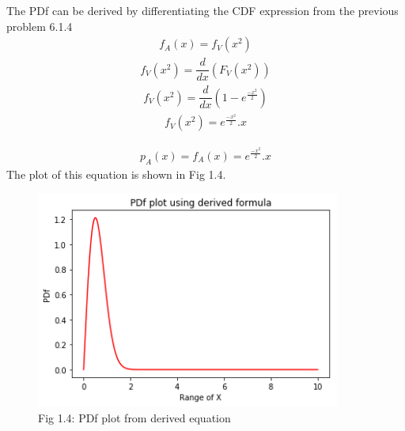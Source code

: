 \documentclass[journal,12pt,twocolumn]{IEEEtran}
\begin{document}
The PDf can be derived by differentiating the CDF expression from the previous problem 6.1.4
\begin{align}f_A(x) = f_V(x^2)\end{align}
\begin{align}f_V(x^2) = \dfrac{d}{dx}(F_V(x^2))\end{align}
\begin{align}f_V(x^2) = \dfrac{d}{dx}(1 - e^\frac{-x^2}{2})\end{align}
\begin{align}f_V(x^2) = e^\frac{-x^2}{2}.x\end{align}
\begin{mdframed}
\begin{align*}p_A(x) = f_A(x) = e^\frac{-x^2}{2}.x\end{align*}
The plot of this equation is shown in Fig 1.4.
\end{mdframed}
\begin{figure}[h!]
    \centering
    \includegraphics[width=10cm]{Assignment-1/Codes/Figures/pdf_actual_Vs_simulate.png}
    \caption*{Fig 1.4: PDf plot from derived equation}
\end{figure}
\end{document}
